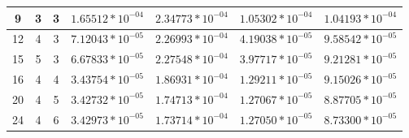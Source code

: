 \documentclass{article}
\begin{document}
\begin{table}
{\begin{tabular}{|c|c|c|c|c|c|c|}
9          & 3           & 3           & $1.65512*10^{-04}$                                                                       & $2.34773*10^{-04}$                                                                      & $1.05302*10^{-04}$                                                                                                      & $1.04193*10^{-04}$                                                                                                   \\ \hline
12         & 4           & 3           & $7.12043*10^{-05}$                                                                       & $2.26993*10^{-04} $                                                                     & $4.19038*10^{-05}$                                                                                                      & $9.58542*10^{-05}$                                                                                                   \\ \hline
15         & 5           & 3           & $6.67833*10^{-05}$                                                                       & $2.27548*10^{-04}$                                                                      & $3.97717*10^{-05}$                                                                                                      & $9.21281*10^{-05}$                                                                                                   \\ \hline
16         & 4           & 4           & $3.43754*10^{-05}$                                                                       & $1.86931*10^{-04}$                                                                      & $1.29211*10^{-05}$                                                                                                      & $9.15026*10^{-05}$                                                                                                   \\ \hline
20         & 4           & 5           & $3.42732*10^{-05}$                                                                      & $1.74713*10^{-04}$                                                                      & $1.27067*10^{-05}$                                                                                                      & $8.87705*10^{-05}$                                                                                                   \\ \hline
24         & 4           & 6           & $3.42973*10^{-05}$                                                                       & $1.73714*10^{-04}$                                                                      & $1.27050*10^{-05}$                                                                                                      & $8.73300*10^{-05}$                                                                                                   \\ \hline

\end{tabular}}
\end{table}
\end{document}
